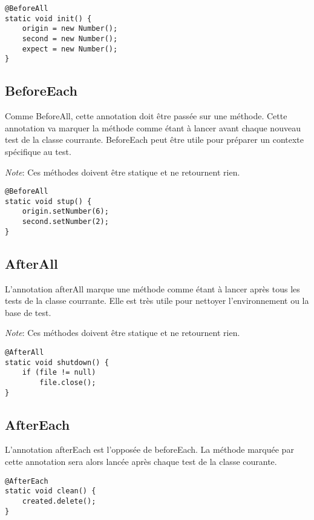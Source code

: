 \documentclass[12pt]{article}		%
\begin{document}
\lstset{language=Java, numbers=left}
\begin{lstlisting}[basicstyle=\small]
@BeforeAll
static void init() {
    origin = new Number();
    second = new Number();
    expect = new Number();
}
\end{lstlisting}

\subsection{BeforeEach}

Comme BeforeAll, cette annotation doit être passée sur une méthode. Cette annotation va marquer la méthode comme étant à lancer avant chaque nouveau test de la classe courrante. BeforeEach peut être utile pour préparer un contexte spécifique au test.

\textit{Note}: Ces méthodes doivent être statique et ne retournent rien.

\lstset{language=Java, numbers=left}
\begin{lstlisting}[basicstyle=\small]
@BeforeAll
static void stup() {
    origin.setNumber(6);
    second.setNumber(2);
}
\end{lstlisting}

\subsection{AfterAll}

L'annotation afterAll marque une méthode comme étant à lancer après tous les tests de la classe courrante. Elle est très utile pour nettoyer l'environnement ou la base de test.

\textit{Note}: Ces méthodes doivent être statique et ne retournent rien.

\lstset{language=Java, numbers=left}
\begin{lstlisting}[basicstyle=\small]
@AfterAll
static void shutdown() {
    if (file != null)
        file.close();
}
\end{lstlisting}

\subsection{AfterEach}

L'annotation afterEach est l'opposée de beforeEach. La méthode marquée par cette annotation sera alors lancée après chaque test de la classe courante.

\lstset{language=Java, numbers=left}
\begin{lstlisting}[basicstyle=\small]
@AfterEach
static void clean() {
    created.delete();
}
\end{lstlisting}
\end{document}
